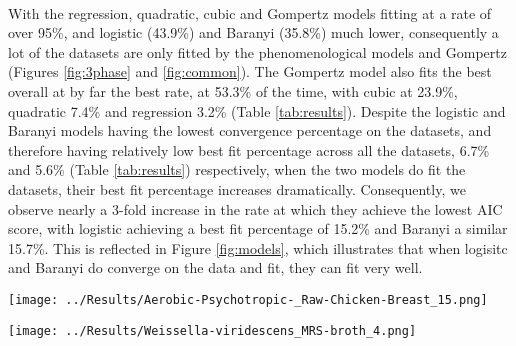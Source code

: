 \documentclass[11pt, a4paper]{article} %
\begin{document}
\paragraph{} With the regression, quadratic, cubic and Gompertz models fitting at a rate of over 95\%, and logistic (43.9\%) and Baranyi (35.8\%) much lower, consequently a lot of the datasets are only fitted by the phenomenological models and Gompertz (Figures \ref{fig:3phase} and \ref{fig:common}). The Gompertz model also fits the best overall at by far the best rate, at 53.3\% of the time, with cubic at 23.9\%, quadratic 7.4\% and regression 3.2\% (Table \ref{tab:results}). Despite the logistic and Baranyi models having the lowest convergence percentage on the datasets, and therefore having relatively low best fit percentage across all the datasets, 6.7\% and 5.6\% (Table \ref{tab:results}) respectively, when the two models do fit the datasets, their best fit percentage increases dramatically. Consequently, we observe nearly a 3-fold increase in the rate at which they achieve the lowest AIC score, with logistic achieving a best fit percentage of 15.2\% and Baranyi a similar 15.7\%. This is reflected in Figure \ref{fig:models}, which illustrates that when logisitc and Baranyi do converge on the data and fit, they can fit very well.

\begin{SCfigure}[][h]
\centering
\texttt{[image: ../Results/Aerobic-Psychotropic-\_Raw-Chicken-Breast\_15.png]} %
\caption{A plot showing the four most frequently converging models: regression, quadratic, cubic and Gompertz, to a three phase growth curve with a lag pahse, exponential phase and stationary phase. The dataset here is \textit{Aerobic Psychotropic} on a raw chicken breast medium at 15\textcelsius{}.}
\label{fig:3phase}
\end{SCfigure}

\begin{SCfigure}[][h!]
\centering
\texttt{[image: ../Results/Weissella-viridescens\_MRS-broth\_4.png]} %
\caption{A plot showing the four most frequently converging models: regression, quadratic, cubic and Gompertz, to a two phase growth curve with a lag phase and exponential phase. The dataset here is \textit{Weissella viridescens} on a MRS broth medium at 7\textcelsius{}.}
\label{fig:common}
\end{SCfigure}
\end{document}

